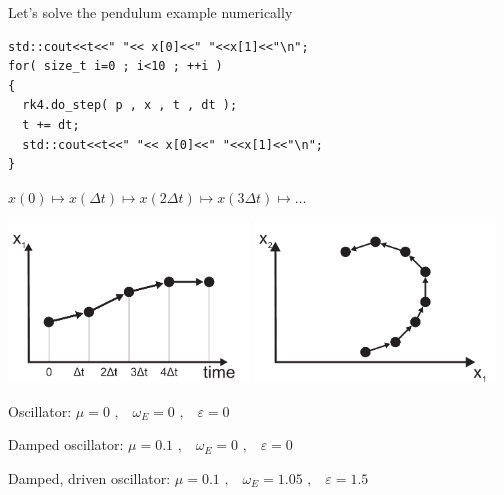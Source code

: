 \begin{frame}[fragile]
 \centerline{ \Large Let's solve the pendulum example numerically}

\vspace{2ex}


\begin{lstlisting}
std::cout<<t<<" "<< x[0]<<" "<<x[1]<<"\n";
for( size_t i=0 ; i<10 ; ++i )
{
  rk4.do_step( p , x , t , dt );
  t += dt;
  std::cout<<t<<" "<< x[0]<<" "<<x[1]<<"\n";
}
\end{lstlisting}

\vspace{1ex}

\centerline{$x(0) \mapsto x(\Delta t) \mapsto x(2\Delta t) \mapsto x(3\Delta t) \mapsto \dots$}

\vspace{1ex}

\centerline{\includegraphics[draft=false,width=0.48\textwidth]{stepper_temporal_evolution.pdf}
\hspace{1ex}
\includegraphics[draft=false,width=0.48\textwidth]{stepper_phase_space.pdf}}
\end{frame}


\begin{frame}[fragile]

 \vspace{4ex}

 \centerline{Oscillator: $\mu=0 \,\, \text{,} \quad \omega_E = 0 \,\, \text{,} \quad \varepsilon=0$}

 \vspace{2ex}
 
\centerline{Damped oscillator: $\mu=0.1 \,\, \text{,} \quad \omega_E = 0 \,\, \text{,} \quad \varepsilon=0$}

 \vspace{2ex}

 \centerline{Damped, driven oscillator: $\mu=0.1 \,\, \text{,} \quad \omega_E = 1.05 \,\, \text{,} \quad \varepsilon=1.5$}
\end{frame}

